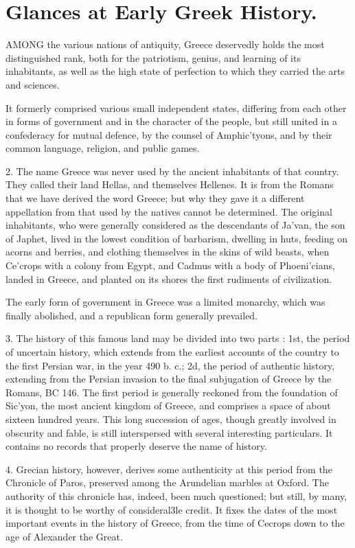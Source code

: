 \documentclass[openany,a4paper]{memoir}
\begin{document}
\chapter{Glances at Early Greek History.} 

AMONG the various nations of antiquity, Greece deservedly holds the most distinguished rank, both for 
the patriotism, genius, and learning of its inhabitants, as 
well as the high state of perfection to which they carried the 
arts and sciences. 

It formerly comprised various small independent states, 
differing from each other in forms of government and in 
the character of the people, but still united in a confederacy 
for mutual defence, by the counsel of Amphic'tyons, and by 
their common language, religion, and public games. 

2. The name Greece was never used by the ancient inhabitants of that country. They called their land Hellas, and 
themselves Hellenes. It is from the Romans that we have 
derived the word Greece; but why they gave it a different 
appellation from that used by the natives cannot be determined. The original inhabitants, who were generally considered as the descendants of Ja'van, the son of Japhet, 
lived in the lowest condition of barbarism, dwelling in huts, 
feeding on acorns and berries, and clothing themselves in 
the skins of wild beasts, when Ce'crops with a colony from 
Egypt, and Cadmus with a body of Phoeni'cians, landed in 
Greece, and planted on its shores the first rudiments of 
civilization. 

The early form of government in Greece was a limited 
monarchy, which was finally abolished, and a republican form 
generally prevailed. 

3. The history of this famous land may be divided into 
two parts : 1st, the period of uncertain history, which extends from the earliest accounts of the country to the first 
Persian war, in the year 490 b. c.; 2d, the period of authentic 
history, extending from the Persian invasion to the final 
subjugation of Greece by the Romans, BC 146. The first 
period is generally reckoned from the foundation of Sic'yon, 
the most ancient kingdom of Greece, and comprises a space 
of about sixteen hundred years. This long succession of ages, 
though greatly involved in obscurity and fable, is still interspersed with several interesting particulars. It contains no 
records that properly deserve the name of history. 

4. Grecian history, however, derives some authenticity at 
this period from the Chronicle of Paros, preserved among 
the Arundelian marbles at Oxford. The authority of this 
chronicle has, indeed, been much questioned; but still, by 
many, it is thought to be worthy of consideral3le credit. It 
fixes the dates of the most important events in the history 
of Greece, from the time of Cecrops down to the age of 
Alexander the Great. 
\end{document}
